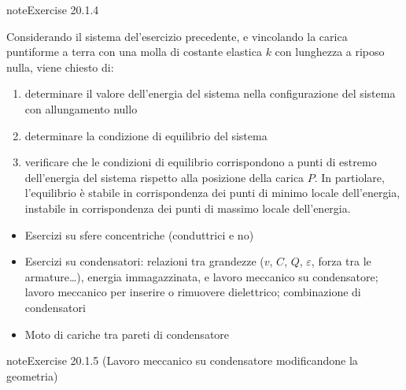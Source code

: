 \documentclass[letterpaper,10pt,italian]{jupyterBook}
\begin{document}
\begin{sphinxadmonition}{note}{Exercise 20.1.4}



\sphinxAtStartPar
Considerando il sistema del’esercizio precedente, e vincolando la carica puntiforme a terra con una molla di costante elastica \(k\) con lunghezza a riposo nulla, viene chiesto di:
\begin{enumerate}
%
\item {} 
\sphinxAtStartPar
determinare il valore dell’energia del sistema nella configurazione del sistema con allungamento nullo

\item {} 
\sphinxAtStartPar
determinare la condizione di equilibrio del sistema

\item {} 
\sphinxAtStartPar
verificare che le condizioni di equilibrio corrispondono a punti di estremo dell’energia del sistema rispetto alla posizione della carica \(P\). In partiolare, l’equilibrio è stabile in corrispondenza dei punti di minimo locale dell’energia, instabile in corrispondenza dei punti di massimo locale dell’energia.

\end{enumerate}
\end{sphinxadmonition}
\begin{itemize}
\item {} 
\sphinxAtStartPar
Esercizi su sfere concentriche (conduttrici e no)

\item {} 
\sphinxAtStartPar
Esercizi su condensatori: relazioni tra grandezze (\(v\), \(C\), \(Q\), \(\varepsilon\), forza tra le armature…), energia immagazzinata, e lavoro meccanico su condensatore; lavoro meccanico per inserire o rimuovere dielettrico; combinazione di condensatori

\item {} 
\sphinxAtStartPar
Moto di cariche tra pareti di condensatore

\end{itemize}
 \label{exercise:ch/electromagnetism/electrostatics-problems-exercise-4}

\begin{sphinxadmonition}{note}{Exercise 20.1.5 (Lavoro meccanico su condensatore modificandone la geometria)}


\end{sphinxadmonition}
 \label{exercise:ch/electromagnetism/electrostatics-problems-exercise-5}
\end{document}
